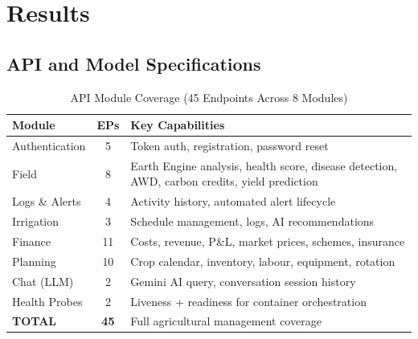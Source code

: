 \documentclass[conference]{IEEEtran}
\begin{document}
\section{Results}
\label{sec:results}

\subsection{API and Model Specifications}

\begin{table}[H]
\caption{API Module Coverage (45 Endpoints Across 8 Modules)}
\label{tab:api}
\centering
\renewcommand{\arraystretch}{1.2}
\begin{tabular}{|p{1.85cm}|c|p{4.0cm}|}
\hline
\textbf{Module} & \textbf{EPs} & \textbf{Key Capabilities} \\
\hline
Authentication & 5 & Token auth, registration, password reset \\
\hline
Field & 8 & Earth Engine analysis, health score, disease detection, AWD, carbon credits, yield prediction \\
\hline
Logs \& Alerts & 4 & Activity history, automated alert lifecycle \\
\hline
Irrigation & 3 & Schedule management, logs, AI recommendations \\
\hline
Finance & 11 & Costs, revenue, P\&L, market prices, schemes, insurance \\
\hline
Planning & 10 & Crop calendar, inventory, labour, equipment, rotation \\
\hline
Chat (LLM) & 2 & Gemini AI query, conversation session history \\
\hline
Health Probes & 2 & Liveness + readiness for container orchestration \\
\hline
\textbf{TOTAL} & \textbf{45} & Full agricultural management coverage \\
\hline
\end{tabular}
\end{table}
\end{document}

